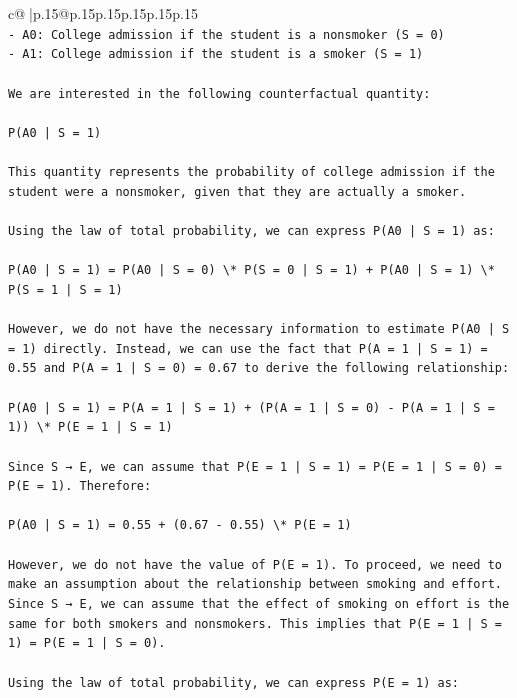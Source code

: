 \documentclass{article}
\begin{document}
{\begin{supertabular}{c@{$\;$}|p{.15\linewidth}@{}p{.15\linewidth}p{.15\linewidth}p{.15\linewidth}p{.15\linewidth}p{.15\linewidth}}
{{{\\ 
\texttt{{-} A0: College admission if the student is a nonsmoker (S = 0)} \\
\texttt{{-} A1: College admission if the student is a smoker (S = 1)} \\
\\ 
\texttt{We are interested in the following counterfactual quantity:} \\
\\ 
\texttt{P(A0 | S = 1)} \\
\\ 
\texttt{This quantity represents the probability of college admission if the student were a nonsmoker, given that they are actually a smoker.} \\
\\ 
\texttt{Using the law of total probability, we can express P(A0 | S = 1) as:} \\
\\ 
\texttt{P(A0 | S = 1) = P(A0 | S = 0) \textbackslash{}* P(S = 0 | S = 1) + P(A0 | S = 1) \textbackslash{}* P(S = 1 | S = 1)} \\
\\ 
\texttt{However, we do not have the necessary information to estimate P(A0 | S = 1) directly. Instead, we can use the fact that P(A = 1 | S = 1) = 0.55 and P(A = 1 | S = 0) = 0.67 to derive the following relationship:} \\
\\ 
\texttt{P(A0 | S = 1) = P(A = 1 | S = 1) + (P(A = 1 | S = 0) {-} P(A = 1 | S = 1)) \textbackslash{}* P(E = 1 | S = 1)} \\
\\ 
\texttt{Since S → E, we can assume that P(E = 1 | S = 1) = P(E = 1 | S = 0) = P(E = 1). Therefore:} \\
\\ 
\texttt{P(A0 | S = 1) = 0.55 + (0.67 {-} 0.55) \textbackslash{}* P(E = 1)} \\
\\ 
\texttt{However, we do not have the value of P(E = 1). To proceed, we need to make an assumption about the relationship between smoking and effort. Since S → E, we can assume that the effect of smoking on effort is the same for both smokers and nonsmokers. This implies that P(E = 1 | S = 1) = P(E = 1 | S = 0).} \\
\\ 
\texttt{Using the law of total probability, we can express P(E = 1) as:} \\
\\ 
}}}
\end{supertabular}}
\end{document}
